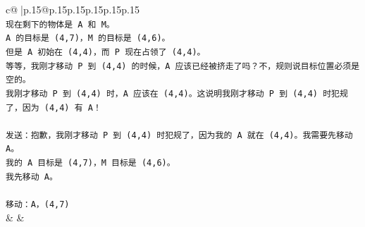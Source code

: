 \documentclass{article}
\begin{document}
{\begin{supertabular}{c@{$\;$}|p{.15\linewidth}@{}p{.15\linewidth}p{.15\linewidth}p{.15\linewidth}p{.15\linewidth}p{.15\linewidth}}
{{{\\ 
\texttt{现在剩下的物体是 A 和 M。} \\
\texttt{A 的目标是 (4,7)，M 的目标是 (4,6)。} \\
\texttt{但是 A 初始在 (4,4)，而 P 现在占领了 (4,4)。} \\
\texttt{等等，我刚才移动 P 到 (4,4) 的时候，A 应该已经被挤走了吗？不，规则说目标位置必须是空的。} \\
\texttt{我刚才移动 P 到 (4,4) 时，A 应该在 (4,4)。这说明我刚才移动 P 到 (4,4) 时犯规了，因为 (4,4) 有 A！} \\
\\ 
\texttt{发送：抱歉，我刚才移动 P 到 (4,4) 时犯规了，因为我的 A 就在 (4,4)。我需要先移动 A。} \\
\texttt{我的 A 目标是 (4,7)，M 目标是 (4,6)。} \\
\texttt{我先移动 A。} \\
\\ 
\texttt{移动：A，(4,7)} \\
            }
        }
    }
    & & \\ \\


\end{supertabular}}
\end{document}
